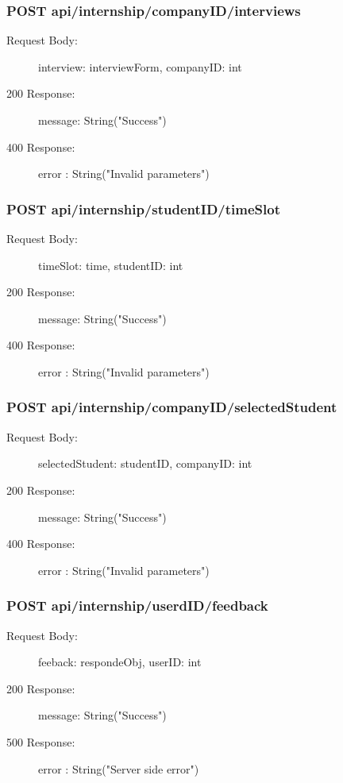 \documentclass[a4paper,12pt]{article}
\begin{document}
\subsubsection*{POST api/internship/{companyID}/interviews}
\begin{description}
    \item[Request Body:] interview: interviewForm, companyID: int
    \item[200 Response:] message: String("Success") 
    \item[400 Response:] error : String("Invalid parameters")
\end{description}

\subsubsection*{POST api/internship/{studentID}/timeSlot}
\begin{description}
    \item[Request Body:] timeSlot: time, studentID: int
    \item[200 Response:] message: String("Success") 
    \item[400 Response:] error : String("Invalid parameters")
\end{description}

\subsubsection*{POST api/internship/{companyID}/selectedStudent}
\begin{description}
    \item[Request Body:] selectedStudent: studentID, companyID: int
    \item[200 Response:] message: String("Success") 
    \item[400 Response:] error : String("Invalid parameters")
\end{description}

\subsubsection*{POST api/internship/{userdID}/feedback}
\begin{description}
    \item[Request Body:] feeback: respondeObj, userID: int
    \item[200 Response:] message: String("Success") 
    \item[500 Response:] error : String("Server side error")
\end{description}
\end{document}
